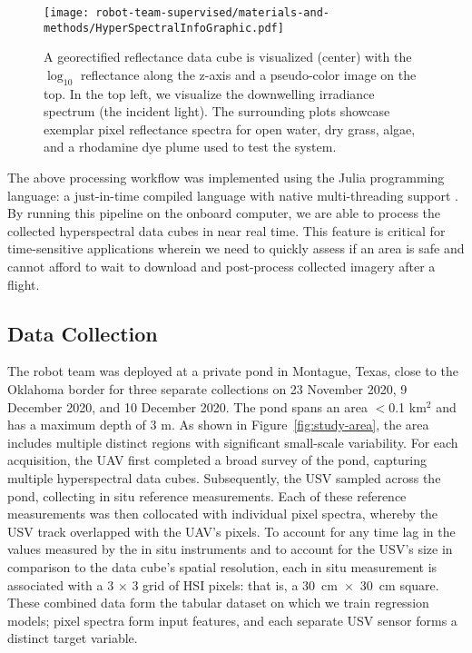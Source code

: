 \begin{figure}[H]
\centering
\vspace{-0.1in}
\texttt{[image: robot-team-supervised/materials-and-methods/HyperSpectralInfoGraphic.pdf]}
\caption{A georectified reflectance data cube is visualized (center) with the $\log_{10}$ reflectance along the z-axis and a pseudo-color image on the top. In the top left, we visualize the downwelling irradiance spectrum (the incident light). The surrounding plots showcase exemplar pixel reflectance spectra for open water, dry grass, algae, and a rhodamine dye plume used to test the system.\label{fig:hsi-infographic}}
\end{figure}  

The above processing workflow was implemented using the Julia programming language: a just-in-time compiled language with native multi-threading support \cite{bezanson2012julia}. By running this pipeline on the onboard computer, we are able to process the collected hyperspectral data cubes in near real time. This feature is critical for time-sensitive applications wherein we need to quickly assess if an area is safe and cannot afford to wait to download and post-process collected imagery after a flight.

\subsection{Data Collection}

The robot team was deployed at a private pond in Montague, Texas, close to the Oklahoma border for three separate collections on 23 November 2020, 9 December 2020, and 10 December 2020. The pond spans an area $<$0.1 km$^{2}$ and has a maximum depth of 3 m. As shown in Figure~\ref{fig:study-area}, the area includes multiple distinct regions with significant small-scale variability. For each acquisition, the UAV first completed a broad survey of the pond, capturing multiple hyperspectral data cubes. Subsequently, the USV sampled across the pond, collecting in situ reference measurements. Each of these reference measurements was then collocated with individual pixel spectra, whereby the USV track overlapped with the UAV's pixels. To account for any time lag in the values measured by the in situ instruments and to account for the USV's size in comparison to the data cube's spatial resolution, each in situ measurement is associated with a 3 $\times$ 3 grid of HSI pixels: that is, a \mbox{30 cm $\times$ 30 cm} square. These combined data form the tabular dataset on which we train regression models; pixel spectra form input features, and each separate USV sensor forms a distinct target variable.

